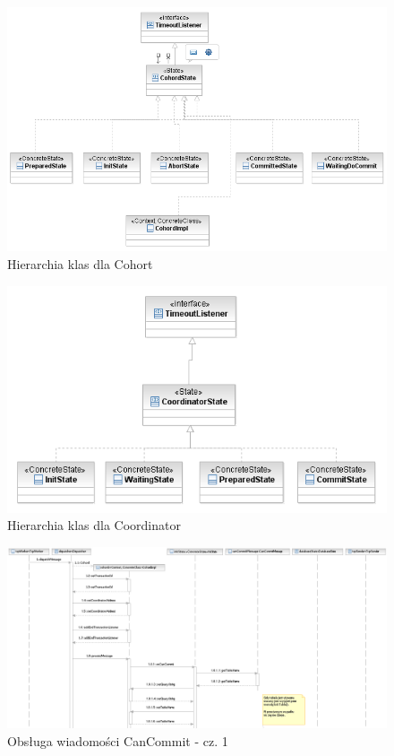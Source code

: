 \documentclass[a4paper, oneside, 11pt]{report}
\begin{document}
\begin{figure}[h]
\centering
\includegraphics[width=15cm]{sekwencje/CohCohordStates.png}
\caption{Hierarchia klas dla Cohort}
\end{figure}


\begin{figure}[h]
\centering
\includegraphics[width=15cm]{sekwencje/CorCoordinatorStates.png}
\caption{Hierarchia klas dla Coordinator}
\end{figure}


\begin{figure}[h]
\centering
\includegraphics[width=22cm,angle=90]{sekwencje/CanCommitMessage1.png}
\caption{Obsługa wiadomości CanCommit - cz. 1}
\end{figure}
\end{document}
